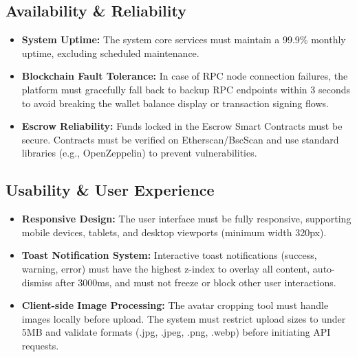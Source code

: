 \subsection{Availability \& Reliability}
\begin{itemize}
    \item \textbf{System Uptime:} The system core services must maintain a 99.9\% monthly uptime, excluding scheduled maintenance.
    \item \textbf{Blockchain Fault Tolerance:} In case of RPC node connection failures, the platform must gracefully fall back to backup RPC endpoints within 3 seconds to avoid breaking the wallet balance display or transaction signing flows.
    \item \textbf{Escrow Reliability:} Funds locked in the Escrow Smart Contracts must be secure. Contracts must be verified on Etherscan/BscScan and use standard libraries (e.g., OpenZeppelin) to prevent vulnerabilities.
\end{itemize}

\subsection{Usability \& User Experience}
\begin{itemize}
    \item \textbf{Responsive Design:} The user interface must be fully responsive, supporting mobile devices, tablets, and desktop viewports (minimum width 320px).
    \item \textbf{Toast Notification System:} Interactive toast notifications (success, warning, error) must have the highest z-index to overlay all content, auto-dismiss after 3000ms, and must not freeze or block other user interactions.
    \item \textbf{Client-side Image Processing:} The avatar cropping tool must handle images locally before upload. The system must restrict upload sizes to under 5MB and validate formats (.jpg, .jpeg, .png, .webp) before initiating API requests.
\end{itemize}